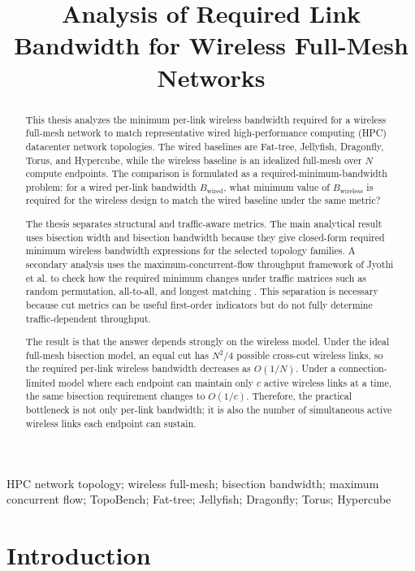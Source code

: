 \documentclass[conference]{IEEEtran}
\title{Analysis of Required Link Bandwidth for Wireless Full-Mesh Networks}
\author{
\IEEEauthorblockN{Woo-Nyeong Choe, Tae-In Oh, and Young-Chai Ko}
\IEEEauthorblockA{\textit{School of Electrical Engineering, Korea University, Seoul, South Korea} \\
\{hyy741, logan10, koyc\}@korea.ac.kr}
}
\begin{document}
\maketitle

\begin{abstract}
This thesis analyzes the minimum per-link wireless bandwidth required for a wireless full-mesh network to match representative wired high-performance computing (HPC) datacenter network topologies. The wired baselines are Fat-tree, Jellyfish, Dragonfly, Torus, and Hypercube, while the wireless baseline is an idealized full-mesh over \(N\) compute endpoints. The comparison is formulated as a required-minimum-bandwidth problem: for a wired per-link bandwidth \(B_{\mathrm{wired}}\), what minimum value of \(B_{\mathrm{wireless}}\) is required for the wireless design to match the wired baseline under the same metric?

The thesis separates structural and traffic-aware metrics. The main analytical result uses bisection width and bisection bandwidth because they give closed-form required minimum wireless bandwidth expressions for the selected topology families. A secondary analysis uses the maximum-concurrent-flow throughput framework of Jyothi et al. to check how the required minimum changes under traffic matrices such as random permutation, all-to-all, and longest matching \cite{jyothi2016}. This separation is necessary because cut metrics can be useful first-order indicators but do not fully determine traffic-dependent throughput.

The result is that the answer depends strongly on the wireless model. Under the ideal full-mesh bisection model, an equal cut has \(N^2/4\) possible cross-cut wireless links, so the required per-link wireless bandwidth decreases as \(O(1/N)\). Under a connection-limited model where each endpoint can maintain only \(c\) active wireless links at a time, the same bisection requirement changes to \(O(1/c)\). Therefore, the practical bottleneck is not only per-link bandwidth; it is also the number of simultaneous active wireless links each endpoint can sustain.
\end{abstract}

\begin{IEEEkeywords}
HPC network topology; wireless full-mesh; bisection bandwidth; maximum concurrent flow; TopoBench; Fat-tree; Jellyfish; Dragonfly; Torus; Hypercube
\end{IEEEkeywords}

\section{Introduction}
\end{document}
